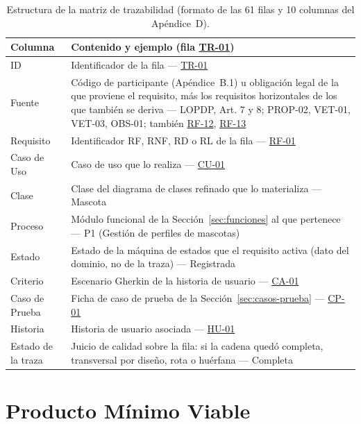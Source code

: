 \documentclass[journal,onecolumn]{IEEEtran}
\begin{document}
\begin{table}[H]
	\centering
	\caption{Estructura de la matriz de trazabilidad (formato de las 61 filas y 10 columnas del Apéndice~D).}
	\label{tab:trazabilidad}
	\small
	\begin{tabularx}{\textwidth}{@{}l X@{}}
		\toprule
		\textbf{Columna} & \textbf{Contenido y ejemplo (fila \hyperref[tr:01]{TR-01})} \\
		\midrule
		ID & Identificador de la fila --- \hyperref[tr:01]{TR-01} \\
		Fuente & Código de participante (Apéndice~B.1) u obligación legal de la que proviene el requisito, más los requisitos horizontales de los que también se deriva --- LOPDP, Art. 7 y 8; PROP-02, VET-01, VET-03, OBS-01; también \hyperref[tab:RF-12]{RF-12}, \hyperref[tab:RF-13]{RF-13} \\
		Requisito & Identificador RF, RNF, RD o RL de la fila --- \hyperref[tab:RF-01]{RF-01} \\
		Caso de Uso & Caso de uso que lo realiza --- \hyperref[tab:CU-01]{CU-01} \\
		Clase & Clase del diagrama de clases refinado que lo materializa --- Mascota \\
		Proceso & Módulo funcional de la Sección~\ref{sec:funciones} al que pertenece --- P1 (Gestión de perfiles de mascotas) \\
		Estado & Estado de la máquina de estados que el requisito activa (dato del dominio, no de la traza) --- Registrada \\
		Criterio & Escenario Gherkin de la historia de usuario --- \hyperref[lst:ca01]{CA-01} \\
		Caso de Prueba & Ficha de caso de prueba de la Sección~\ref{sec:casos-prueba} --- \hyperref[tab:CP-01]{CP-01} \\
		Historia & Historia de usuario asociada --- \hyperref[tab:HU-01]{HU-01} \\
		Estado de la traza & Juicio de calidad sobre la fila: si la cadena quedó completa, transversal por diseño, rota o huérfana --- Completa \\
		\bottomrule
	\end{tabularx}
\end{table}

	\section{Producto Mínimo Viable}
	\label{sec:mvp}
	
\end{document}

